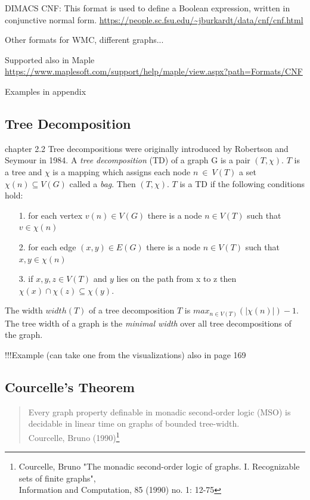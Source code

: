 \documentclass[a4paper, 12pt]{scrartcl}
\begin{document}
DIMACS CNF: This format is used to define a Boolean expression, written in conjunctive normal form.
\url{https://people.sc.fsu.edu/~jburkardt/data/cnf/cnf.html}

Other formats for WMC, different graphs...

Supported also in Maple \url{https://www.maplesoft.com/support/help/maple/view.aspx?path=Formats/CNF}

Examples in appendix

\subsection{Tree Decomposition}
\cite{DiplomarbeitZisser}chapter 2.2
Tree decompositions were originally introduced by Robertson and Seymour \cite{ROBERTSON198449} in 1984.
A \textit{tree decomposition} (TD) of a graph G is a pair $(T, \chi)$. $T$ is a tree and $\chi$ is a mapping which assigns each node $n~\in~V(T)$ 
a set $\chi(n) \subseteq V(G)$ called a \textit{bag}. Then $(T, \chi)$. $T$ is a TD if the following conditions hold:

\begin{itemize}
	\item[1.] for each vertex $v(n) \in V(G)$ there is a node $n \in V(T)$ such that $v \in \chi(n)$
	\item[2.] for each edge $(x,y) \in E(G)$ there is a node $n\in V(T)$ such that $x,y \in\chi(n)$
	\item[3.] if $x,y,z \in V(T)$ and $y$ lies on the path from x to z then $\chi(x) \cap \chi(z) \subseteq \chi(y)$.
\end{itemize}
The width $width(T)$ of a tree decomposition $T$ is $max_{n\in V(T)}(|\chi(n)|)-1$.
The tree width of a graph is the \textit{minimal width} over all tree decompositions of the graph.

!!!Example (can take one from the visualizations) also in \cite{pcgp2019} page 169
\subsection{Courcelle's Theorem}
\begin{quotation}
	Every graph property definable in monadic second-order logic (MSO) is decidable in linear time on graphs of bounded tree-width.\\
	{\small Courcelle, Bruno (1990)}\footnote{Courcelle, Bruno "The monadic second-order logic of graphs. I. Recognizable sets of finite graphs",\\ Information and Computation, 85 (1990) no. 1: 12-75}
\end{quotation}
\end{document}
